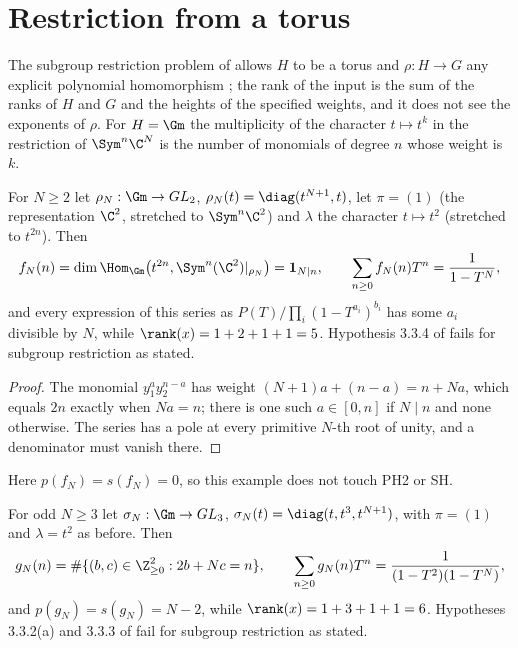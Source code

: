 \section{Restriction from a torus}\label{sec:torus}

The subgroup restriction problem of \cite[Section 3.4]{GCT6} allows $H$ to be a
torus and $\rho:H\to G$ any explicit polynomial homomorphism
\cite[Section 3.4.1]{GCT6}; the rank of the input is the sum of the ranks of
$H$ and $G$ and the heights of the specified weights, and it does not see the
exponents of $\rho$. For $H=\Gm$ the multiplicity of the character $t\mapsto
t^{k}$ in the restriction of $\Sym^n\C^N$ is the number of monomials of degree
$n$ whose weight is $k$.

\begin{proposition}\label{prop:torusmodular}
For $N\ge2$ let $\rho_N:\Gm\to GL_2$, $\rho_N(t)=\diag(t^{N+1},t)$, let $\pi=(1)$
(the representation $\C^2$, stretched to $\Sym^n\C^2$) and $\lambda$ the
character $t\mapsto t^2$ (stretched to $t^{2n}$). Then
\[
 f_N(n)=\dim\Hom_{\Gm}\bigl(t^{2n},\Sym^n(\C^2)|_{\rho_N}\bigr)=\mathbf1_{N\mid n},
 \qquad \sum_{n\ge0}f_N(n)T^n=\frac1{1-T^N},
\]
and every expression of this series as $P(T)/\prod_i(1-T^{a_i})^{b_i}$ has some
$a_i$ divisible by $N$, while $\rank(x)=1+2+1+1=5$. Hypothesis 3.3.4 of
\cite{GCT6} fails for subgroup restriction as stated.
\end{proposition}

\begin{proof}
The monomial $y_1^ay_2^{n-a}$ has weight $(N+1)a+(n-a)=n+Na$, which equals
$2n$ exactly when $Na=n$; there is one such $a\in[0,n]$ if $N\mid n$ and none
otherwise. The series has a pole at every primitive $N$-th root of unity, and a
denominator must vanish there.
\end{proof}

Here $p(f_N)=s(f_N)=0$, so this example does not touch PH2 or SH.

\begin{proposition}\label{prop:torusindices}
For odd $N\ge3$ let $\sigma_N:\Gm\to GL_3$, $\sigma_N(t)=\diag(t,t^3,t^{N+1})$,
with $\pi=(1)$ and $\lambda=t^2$ as before. Then
\[
 g_N(n)=\#\{(b,c)\in\Z_{\ge0}^2:2b+Nc=n\},\qquad
 \sum_{n\ge0}g_N(n)T^n=\frac1{(1-T^2)(1-T^N)},
\]
and $p(g_N)=s(g_N)=N-2$, while $\rank(x)=1+3+1+1=6$. Hypotheses 3.3.2(a) and
3.3.3 of \cite{GCT6} fail for subgroup restriction as stated.
\end{proposition}

